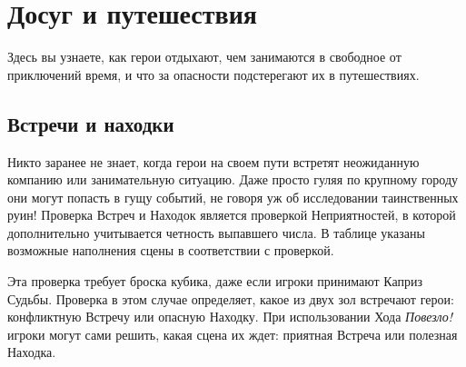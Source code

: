 \chapter{Досуг и путешествия}
Здесь вы узнаете, как герои отдыхают, чем занимаются в свободное от приключений время, и что за опасности подстерегают их в путешествиях.
\section{Встречи и находки}
Никто заранее не знает, когда герои на своем пути встретят неожиданную компанию или занимательную ситуацию. Даже просто гуляя по крупному городу они могут попасть в гущу событий, не говоря уж об исследовании таинственных руин!
\newline Проверка Встреч и Находок является проверкой Неприятностей, в которой дополнительно учитывается четность выпавшего числа. В таблице указаны возможные наполнения сцены в соответствии с проверкой.
\begin{tcolorbox}
Эта проверка требует броска кубика, даже если игроки принимают Каприз Судьбы. Проверка в этом случае определяет, какое из двух зол встречают герои: конфликтную Встречу или опасную Находку.
\newline При использовании Хода \textit{Повезло!} игроки могут сами решить, какая сцена их ждет: приятная Встреча или полезная Находка.
\end{tcolorbox}

